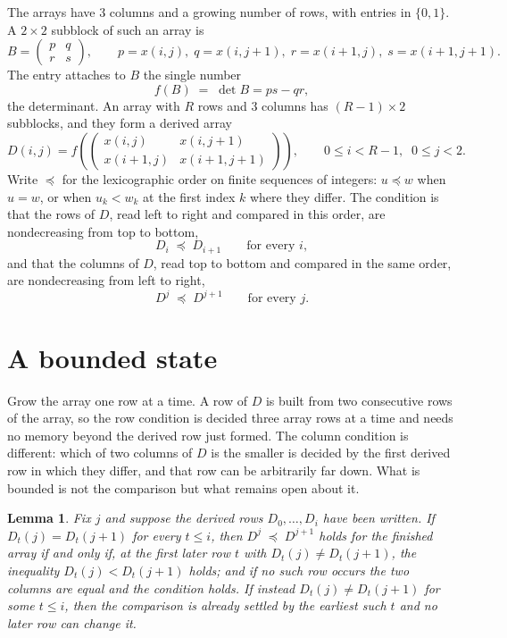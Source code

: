 \documentclass[11pt,a4paper]{article}
\theoremstyle{plain}
\newtheorem{lemma}[theorem]{Lemma}
\theoremstyle{definition}
\begin{document}
The arrays have $3$ columns and a growing number of rows, with entries in $\{0,1\}$. A
$2\times2$ subblock of such an array is
\[
B=\begin{pmatrix} p & q \\ r & s \end{pmatrix},
\qquad p=x(i,j),\; q=x(i,j+1),\; r=x(i+1,j),\; s=x(i+1,j+1).
\]
The entry attaches to $B$ the single number
\[
f(B)\;=\;\det B=ps-qr,
\]
the determinant. An array with $R$ rows and $3$ columns has $(R-1)\times2$ subblocks, and they
form a derived array
\[
D(i,j)=f\!\left(\begin{pmatrix} x(i,j) & x(i,j+1) \\ x(i+1,j) & x(i+1,j+1)\end{pmatrix}
\right),\qquad 0\le i<R-1,\;\; 0\le j<2 .
\]
Write $\preceq$ for the lexicographic order on finite sequences of integers: $u\preceq w$ when
$u=w$, or when $u_k<w_k$ at the first index $k$ where they differ. The condition is that the
rows of $D$, read left to right and compared in this order, are nondecreasing from top to bottom,
\[
D_{i}\;\preceq\;D_{i+1}\qquad\text{for every } i,
\]
and that the columns of $D$, read top to bottom and compared in the same order, are nondecreasing
from left to right,
\[
D^{j}\;\preceq\;D^{j+1}\qquad\text{for every } j .
\]

\section{A bounded state}

Grow the array one row at a time. A row of $D$ is built from two consecutive rows of the array,
so the row condition is decided three array rows at a time and needs no memory beyond the
derived row just formed. The column condition is different: which of two columns of $D$ is the
smaller is decided by the first derived row in which they differ, and that row can be
arbitrarily far down. What is bounded is not the comparison but what remains open about it.

\begin{lemma}\label{lem:bits}
Fix $j$ and suppose the derived rows $D_0,\dots,D_i$ have been written. If $D_t(j)=D_t(j+1)$ for
every $t\le i$, then $D^{j}\;\preceq\;D^{j+1}$ holds for the finished array if and only if,
at the first later row $t$ with $D_t(j)\neq D_t(j+1)$, the inequality $D_t(j)<D_t(j+1)$
holds; and if no such row occurs the two columns are equal and the condition holds. If instead
$D_t(j)\neq D_t(j+1)$ for some $t\le i$, then the comparison is already settled by the earliest
such $t$ and no later row can change it.
\end{lemma}
\end{document}
